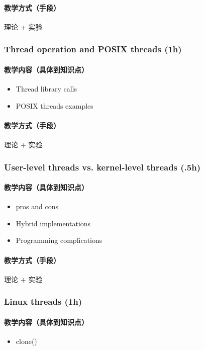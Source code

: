 \documentclass[11pt]{article}
\begin{document}
\paragraph{教学方式（手段）}
\label{sec-2-2-8-2}
理论 + 实验
\subsubsection{Thread operation and POSIX threads (1h)}
\label{sec-2-2-9}
\paragraph{教学内容（具体到知识点）}
\label{sec-2-2-9-1}
\begin{itemize}
\item Thread library calls
\item POSIX threads examples
\end{itemize}
\paragraph{教学方式（手段）}
\label{sec-2-2-9-2}
理论 + 实验
\subsubsection{User-level threads vs. kernel-level threads (.5h)}
\label{sec-2-2-10}
\paragraph{教学内容（具体到知识点）}
\label{sec-2-2-10-1}
\begin{itemize}
\item pros and cons
\item Hybrid implementations
\item Programming complications
\end{itemize}
\paragraph{教学方式（手段）}
\label{sec-2-2-10-2}
理论 + 实验
\subsubsection{Linux threads (1h)}
\label{sec-2-2-11}
\paragraph{教学内容（具体到知识点）}
\label{sec-2-2-11-1}
\begin{itemize}
\item clone()
\end{itemize}
\end{document}
